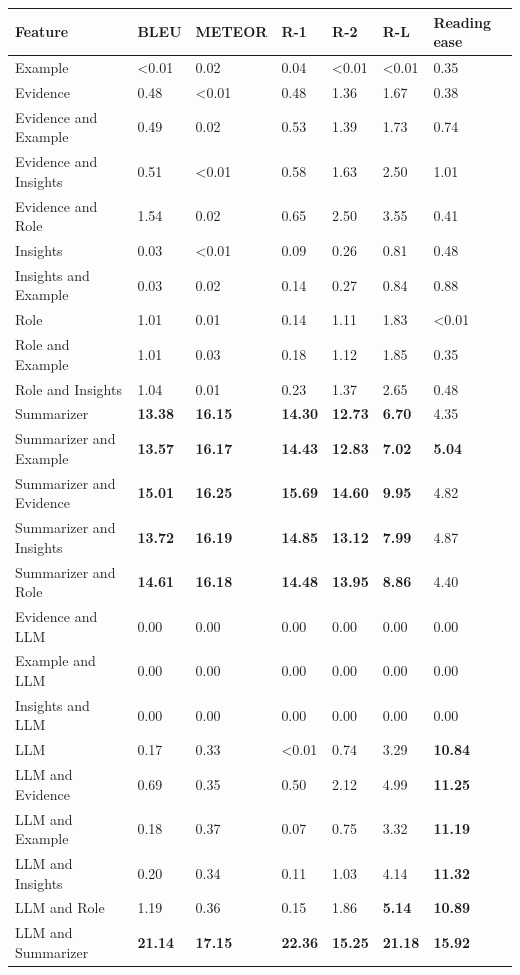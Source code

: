 \begin{tabular}{|l|l|l|l|l|l|l|}
\hline
\textbf{Feature} & BLEU & METEOR & R-1 & R-2 & R-L & Reading ease \\
 \hline
 Example & \textless{}0.01 & 0.02 & 0.04 & \textless{}0.01 & \textless{}0.01 & 0.35 \\
 \hline
 Evidence & 0.48 & \textless{}0.01 & 0.48 & 1.36 & 1.67 & 0.38 \\
 \hline
 Evidence and Example & 0.49 & 0.02 & 0.53 & 1.39 & 1.73 & 0.74 \\
 \hline
 Evidence and Insights & 0.51 & \textless{}0.01 & 0.58 & 1.63 & 2.50 & 1.01 \\
 \hline
 Evidence and Role & 1.54 & 0.02 & 0.65 & 2.50 & 3.55 & 0.41 \\
 \hline
 Insights & 0.03 & \textless{}0.01 & 0.09 & 0.26 & 0.81 & 0.48 \\
 \hline
 Insights and Example & 0.03 & 0.02 & 0.14 & 0.27 & 0.84 & 0.88 \\
 \hline
 Role & 1.01 & 0.01 & 0.14 & 1.11 & 1.83 & \textless{}0.01 \\
 \hline
 Role and Example & 1.01 & 0.03 & 0.18 & 1.12 & 1.85 & 0.35 \\
 \hline
 Role and Insights & 1.04 & 0.01 & 0.23 & 1.37 & 2.65 & 0.48 \\
 \hline
 Summarizer & \textbf{13.38} & \textbf{16.15} & \textbf{14.30} & \textbf{12.73} & \textbf{6.70} & 4.35 \\
 \hline
 Summarizer and Example & \textbf{13.57} & \textbf{16.17} & \textbf{14.43} & \textbf{12.83} & \textbf{7.02} & \textbf{5.04} \\
 \hline
 Summarizer and Evidence & \textbf{15.01} & \textbf{16.25} & \textbf{15.69} & \textbf{14.60} & \textbf{9.95} & 4.82 \\
 \hline
 Summarizer and Insights & \textbf{13.72} & \textbf{16.19} & \textbf{14.85} & \textbf{13.12} & \textbf{7.99} & 4.87 \\
 \hline
 Summarizer and Role & \textbf{14.61} & \textbf{16.18} & \textbf{14.48} & \textbf{13.95} & \textbf{8.86} & 4.40 \\
 \hline
 Evidence and LLM & 0.00 & 0.00 & 0.00 & 0.00 & 0.00 & 0.00 \\
 \hline
 Example and LLM & 0.00 & 0.00 & 0.00 & 0.00 & 0.00 & 0.00 \\
 \hline
 Insights and LLM & 0.00 & 0.00 & 0.00 & 0.00 & 0.00 & 0.00 \\
 \hline
 LLM & 0.17 & 0.33 & \textless{}0.01 & 0.74 & 3.29 & \textbf{10.84} \\
 \hline
 LLM and Evidence & 0.69 & 0.35 & 0.50 & 2.12 & 4.99 & \textbf{11.25} \\
 \hline
 LLM and Example & 0.18 & 0.37 & 0.07 & 0.75 & 3.32 & \textbf{11.19} \\
 \hline
 LLM and Insights & 0.20 & 0.34 & 0.11 & 1.03 & 4.14 & \textbf{11.32} \\
 \hline
 LLM and Role & 1.19 & 0.36 & 0.15 & 1.86 & \textbf{5.14} & \textbf{10.89} \\
 \hline
 LLM and Summarizer & \textbf{21.14} & \textbf{17.15} & \textbf{22.36} & \textbf{15.25} & \textbf{21.18} & \textbf{15.92} \\
\hline
\end{tabular}
